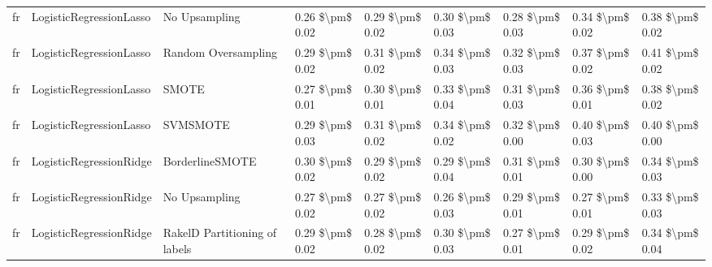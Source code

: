 \begin{tabular}{lllllllll}
      fr &         LogisticRegressionLasso &                 No Upsampling & 0.26 \$\textbackslash pm\$ 0.02 &           0.29 \$\textbackslash pm\$ 0.02 &       0.30 \$\textbackslash pm\$ 0.03 &        0.28 \$\textbackslash pm\$ 0.03 &                         0.34 \$\textbackslash pm\$ 0.02 &     0.38 \$\textbackslash pm\$ 0.02 \\
      fr &         LogisticRegressionLasso &           Random Oversampling & 0.29 \$\textbackslash pm\$ 0.02 &           0.31 \$\textbackslash pm\$ 0.02 &       0.34 \$\textbackslash pm\$ 0.03 &        0.32 \$\textbackslash pm\$ 0.03 &                         0.37 \$\textbackslash pm\$ 0.02 &     0.41 \$\textbackslash pm\$ 0.02 \\
      fr &         LogisticRegressionLasso &                         SMOTE & 0.27 \$\textbackslash pm\$ 0.01 &           0.30 \$\textbackslash pm\$ 0.01 &       0.33 \$\textbackslash pm\$ 0.04 &        0.31 \$\textbackslash pm\$ 0.03 &                         0.36 \$\textbackslash pm\$ 0.01 &     0.38 \$\textbackslash pm\$ 0.02 \\
      fr &         LogisticRegressionLasso &                      SVMSMOTE & 0.29 \$\textbackslash pm\$ 0.03 &           0.31 \$\textbackslash pm\$ 0.02 &       0.34 \$\textbackslash pm\$ 0.02 &        0.32 \$\textbackslash pm\$ 0.00 &                         0.40 \$\textbackslash pm\$ 0.03 &     0.40 \$\textbackslash pm\$ 0.00 \\
      fr &         LogisticRegressionRidge &               BorderlineSMOTE & 0.30 \$\textbackslash pm\$ 0.02 &           0.29 \$\textbackslash pm\$ 0.02 &       0.29 \$\textbackslash pm\$ 0.04 &        0.31 \$\textbackslash pm\$ 0.01 &                         0.30 \$\textbackslash pm\$ 0.00 &     0.34 \$\textbackslash pm\$ 0.03 \\
      fr &         LogisticRegressionRidge &                 No Upsampling & 0.27 \$\textbackslash pm\$ 0.02 &           0.27 \$\textbackslash pm\$ 0.02 &       0.26 \$\textbackslash pm\$ 0.03 &        0.29 \$\textbackslash pm\$ 0.01 &                         0.27 \$\textbackslash pm\$ 0.01 &     0.33 \$\textbackslash pm\$ 0.03 \\
      fr &         LogisticRegressionRidge & RakelD Partitioning of labels & 0.29 \$\textbackslash pm\$ 0.02 &           0.28 \$\textbackslash pm\$ 0.02 &       0.30 \$\textbackslash pm\$ 0.03 &        0.27 \$\textbackslash pm\$ 0.01 &                         0.29 \$\textbackslash pm\$ 0.02 &     0.34 \$\textbackslash pm\$ 0.04 \\

\end{tabular}
